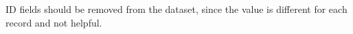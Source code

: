 ID fields should be removed from the dataset, since the value is different for each record and not helpful.



